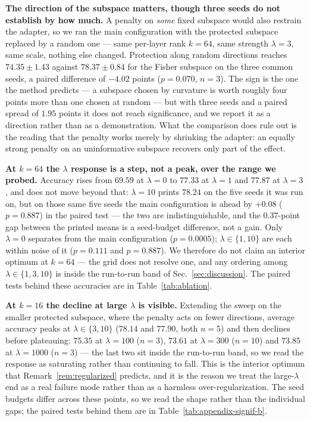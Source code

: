 \textbf{The direction of the subspace matters, though three seeds do not establish by how
much.} A penalty on \emph{some} fixed subspace would also restrain the adapter, so we ran the
main configuration with the protected subspace replaced by a random one --- same per-layer
rank $k{=}64$, same strength $\lambda{=}3$, same scale, nothing else changed. Protection
along random directions reaches $74.35\pm1.43$ against $78.37\pm0.84$ for the Fisher
subspace on the three common seeds, a paired difference of $-4.02$ points ($p=0.070$,
$n{=}3$). The sign is the one the method predicts --- a subspace chosen by curvature is
worth roughly four points more than one chosen at random --- but with three seeds and a
paired spread of $1.95$ points it does not reach significance, and we report it as a
direction rather than as a demonstration. What the comparison does rule out is the reading
that the penalty works merely by shrinking the adapter: an equally strong penalty on an
uninformative subspace recovers only part of the effect.

\textbf{At $k{=}64$ the $\lambda$ response is a step, not a peak, over the range we
probed.} Accuracy rises from $69.59$ at $\lambda=0$ to $77.33$ at $\lambda=1$ and $77.87$
at $\lambda=3$, and does not move beyond that: $\lambda=10$ prints $78.24$ on the five
seeds it was run on, but on those same five seeds the main configuration is ahead by
$+0.08$ ($p=0.887$) in the paired test --- the two are
indistinguishable, and the $0.37$-point gap between the printed means is a seed-budget
difference, not a gain. Only
$\lambda=0$ separates from the main configuration ($p=0.0005$); $\lambda\in\{1,10\}$ are
each within noise of it ($p=0.111$ and $p=0.887$). We therefore do not claim an interior
optimum at $k{=}64$ --- the grid does not resolve one, and any ordering among
$\lambda\in\{1,3,10\}$ is inside the run-to-run band of Sec.~\ref{sec:discussion}. The
paired tests behind these accuracies are in Table~\ref{tab:ablation}.

\textbf{At $k{=}16$ the decline at large $\lambda$ is visible.} Extending the sweep on the
smaller protected subspace, where the penalty acts on fewer directions, average accuracy
peaks at $\lambda\in\{3,10\}$ ($78.14$ and $77.90$, both $n{=}5$) and then declines
before plateauing: $75.35$ at $\lambda=100$ ($n{=}3$), $73.61$ at $\lambda=300$ ($n{=}10$)
and $73.85$ at $\lambda=1000$ ($n{=}3$) --- the last two sit inside the run-to-run band, so
we read the response as saturating rather than continuing to fall. This is the interior
optimum that
Remark~\ref{rem:regularized} predicts, and it is the reason we treat the large-$\lambda$
end as a real failure mode rather than as a harmless over-regularization. The seed budgets
differ across these points, so we read the shape rather than the individual gaps; the
paired tests behind them are in Table~\ref{tab:appendix-signif-b}.

